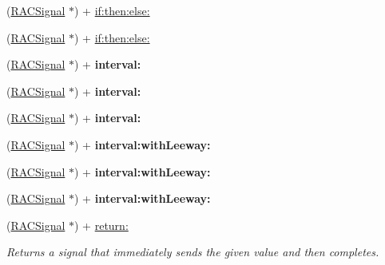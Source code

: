 \begin{DoxyCompactItemize}
(\mbox{\hyperlink{interface_r_a_c_signal}{R\+A\+C\+Signal}} $\ast$) + \mbox{\hyperlink{interface_r_a_c_signal_a67c14dfcf505999bc53632e336f6cb84}{if\+:then\+:else\+:}}
\item 
(\mbox{\hyperlink{interface_r_a_c_signal}{R\+A\+C\+Signal}} $\ast$) + \mbox{\hyperlink{interface_r_a_c_signal_a67c14dfcf505999bc53632e336f6cb84}{if\+:then\+:else\+:}}
\item 
\mbox{\label{interface_r_a_c_signal_a49d012fbe985cf33b2085f5abe100087}} 
(\mbox{\hyperlink{interface_r_a_c_signal}{R\+A\+C\+Signal}} $\ast$) + {\bfseries interval\+:}
\item 
\mbox{\label{interface_r_a_c_signal_a49d012fbe985cf33b2085f5abe100087}} 
(\mbox{\hyperlink{interface_r_a_c_signal}{R\+A\+C\+Signal}} $\ast$) + {\bfseries interval\+:}
\item 
\mbox{\label{interface_r_a_c_signal_a49d012fbe985cf33b2085f5abe100087}} 
(\mbox{\hyperlink{interface_r_a_c_signal}{R\+A\+C\+Signal}} $\ast$) + {\bfseries interval\+:}
\item 
\mbox{\label{interface_r_a_c_signal_afe09d66e4009b9d7a5f6619e0f5018c0}} 
(\mbox{\hyperlink{interface_r_a_c_signal}{R\+A\+C\+Signal}} $\ast$) + {\bfseries interval\+:with\+Leeway\+:}
\item 
\mbox{\label{interface_r_a_c_signal_afe09d66e4009b9d7a5f6619e0f5018c0}} 
(\mbox{\hyperlink{interface_r_a_c_signal}{R\+A\+C\+Signal}} $\ast$) + {\bfseries interval\+:with\+Leeway\+:}
\item 
\mbox{\label{interface_r_a_c_signal_afe09d66e4009b9d7a5f6619e0f5018c0}} 
(\mbox{\hyperlink{interface_r_a_c_signal}{R\+A\+C\+Signal}} $\ast$) + {\bfseries interval\+:with\+Leeway\+:}
\item 
\mbox{\label{interface_r_a_c_signal_a41b2f3cea45bb3a14911299cb572b7d9}} 
(\mbox{\hyperlink{interface_r_a_c_signal}{R\+A\+C\+Signal}} $\ast$) + \mbox{\hyperlink{interface_r_a_c_signal_a41b2f3cea45bb3a14911299cb572b7d9}{return\+:}}
\begin{DoxyCompactList}\small\item\em Returns a signal that immediately sends the given value and then completes. \end{DoxyCompactList}\item 

\end{DoxyCompactItemize}
